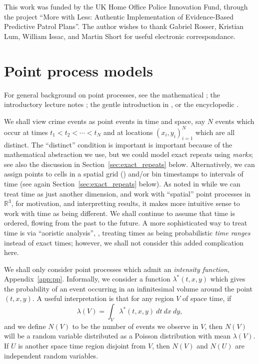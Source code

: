 \documentclass[twoside,a4paper]{article}
\theoremstyle{plain}
\theoremstyle{definition}
\begin{document}
This work was funded by the UK Home Office Police Innovation Fund, through the
project ``More with Less: Authentic Implementation of Evidence-Based Predictive
Patrol Plans''.  The author wishes to thank Gabriel Rosser, Kristian Lum, William Issac,
and Martin Short for useful electronic correspondance.



\section{Point process models}

For general background on point processes, see the mathematical \cite{dvj}; the
introductory lecture notes \cite{ras}; the gentle introduction in \cite[Chapter~8]{rip},
or the encyclopedic \cite{handbookss}.

We shall view crime events as point events in time and space, say $N$ events which occur
at times $t_1 < t_2 < \cdots < t_N$ and at locations $(x_i, y_i)_{i=1}^N$ which are all
distinct.  The ``distinct'' condition is important is important because of the
mathematical abstraction we use, but we could model exact repeats using \emph{marks};
see also the discussion in Section~\ref{sec:exact_repeats} below.
Alternatively, we can assign points to cells in a spatial grid
(\cite{sepp2}) and/or bin timestamps to intervals of time (see again
Section~\ref{sec:exact_repeats} below).
As noted in \cite[Part~V]{handbookss} while we can treat time as just another dimension,
and work with ``spatial'' point processes in $\mathbb R^3$, for motivation, and interpretting
results, it makes more intuitive sense to work with time as being different.  We shall
continue to assume that time is ordered, flowing from the past to the future.
A more sophisticated way to treat time is via ``aoristic analysis'', \cite{ratcliffe},
treating times as being probabilistic \emph{time ranges} instead of exact times; however,
we shall not consider this added complication here.

We shall only consider point processes which admit an \emph{intensity function},
Appendix~\ref{app:pp}.  Informally, we consider a function $\lambda^*(t,x,y)$ which gives
the probability of an event occurring in an infinitesimal volume around the point $(t,x,y)$.
A useful interpretation is that for any region $V$ of space time, if
\begin{equation}
\lambda(V) = \int_V \lambda^*(t,x,y) \ dt \ dx \ dy,
\label{eq:exp_poisson}
\end{equation}
and we define $N(V)$ to be the number of events we observe in $V$, then $N(V)$ will be a
random variable distributed as a Poisson distribution with mean $\lambda(V)$.  If $U$ is
another space time region disjoint from $V$, then $N(V)$ and $N(U)$ are independent random
variables.
\end{document}
